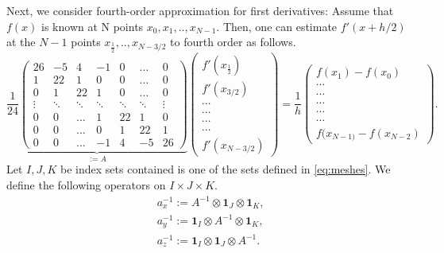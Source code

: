 \documentclass[12pt,reqno]{amsart}
\theoremstyle{definition}
\numberwithin{equation}{section}
\begin{document}
	Next, we consider fourth-order approximation for first derivatives:
	Assume that $f(x)$ is known at N points $x_0,x_1, ..,x_{N-1}$. Then,  one can  estimate  $f'(x+h/2)$ at the $N-1$ points 	$x_{\frac{1}{2}},..,x_{N-3/2}$ to fourth order as follows.
		\begin{equation}\label{eq:lhs}
		\underbrace{
		\frac{1}{24}
		\begin{pmatrix}
			26     & -5     & 4      & -1     & 0      & \dots  & 0      \\
			1      & 22     & 1      & 0      & 0      & \dots  & 0      \\
			0      & 1      & 22     & 1      & 0      & \dots  & 0      \\
			\vdots & \ddots & \ddots & \ddots & \ddots & \ddots & \vdots \\
			0      & 0      & \dots  & 1      & 22     & 1      & 0      \\
			0      & 0      & \dots  & 0      & 1      & 22     & 1      \\
			0      & 0      & \dots  & -1     & 4      & -5     & 26
		\end{pmatrix}}_{:=A}
		\begin{pmatrix}
			f'(x_{\frac{1}{2}}) \\
			f'(x_{3/2}) \\
			\cdots \\
			\cdots\\
			\cdots \\
			\cdots \\
			f'(x_{N-3/2})
		\end{pmatrix}=
		\frac{1}{h}
		\begin{pmatrix}
			f(x_{1})-f(x_0)  \\
			\cdots \\
			\cdots\\
			\cdots \\
			\cdots \\
			\cdots \\
			f(x_{N-1)}-f(x_{N-2})
		\end{pmatrix}.
	\end{equation}
Let $I,J,K$ be index sets contained is one of the sets defined in \eqref{eq:meshes}.
We define the following operators  on $I\times J\times K$.
\begin{align*}
	&
	a_x^{-1}:=A^{-1}\otimes \mathbf{1}_J\otimes \mathbf{1}_K,\\&
		a_y^{-1}:= \mathbf{1}_I\otimes A^{-1}\otimes \mathbf{1}_K, \\&
			a_z^{-1}:= \mathbf{1}_I\otimes \mathbf{1}_J\otimes A^{-1}.
\end{align*}
\end{document}
